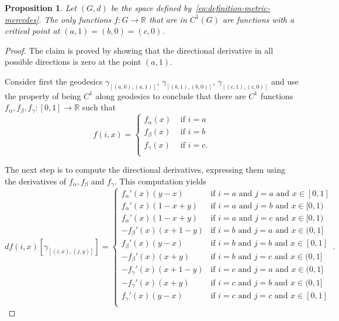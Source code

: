 \documentclass{article}
\theoremstyle{plain}\newtheorem{theorem}{Theorem}[section]
\theoremstyle{plain}\newtheorem{definition}[theorem]{Definition}
\theoremstyle{plain}\newtheorem{lemma}[theorem]{Lemma}
\theoremstyle{definition}\newtheorem{remark}[theorem]{Remark}
\theoremstyle{definition}\newtheorem{example}[theorem]{Example}
\theoremstyle{plain}\newtheorem{proposition}[theorem]{Proposition}
\theoremstyle{plain}\newtheorem{inference}[theorem]{Inference}
\theoremstyle{plain}\newtheorem{corollary}[theorem]{Corollary}
\theoremstyle{plain}\newtheorem{assumption}[theorem]{Assumption}
\newcommand{\bbR}{\mathbb{R}}
\begin{document}
\begin{proposition}
  Let $(G, d)$ be the space defined by~\eqref{eq:definition-metric-mercedes}.
  The only functions $f:G \to \mathbb{R}$ that are in $C^1(G)$  are 
  functions with a critical point at $(a, 1) = (b, 0) = (c, 0)$. 
\end{proposition}
\begin{proof}
The claim is proved by showing that the directional derivative in all possible 
directions is zero at the point $(a, 1)$.   

Consider first the geodesics
  $\gamma_{[(a, 0), (a, 1)]}$, $\gamma_{[(b, 1), (b, 0)]}$, $\gamma_{[(c, 1), (c, 0)]}$ and use
  the property of being $C^1$ along geodesics to conclude that there are $C^1$ functions
  $f_\alpha, f_\beta, f_\gamma:[0, 1] \to \bbR$ such that
  \begin{equation*}
    f(i, x) =
    \left\{
      \begin{array}{ll}
        f_\alpha(x) & \text{ if } i = a  \\
        f_\beta(x) & \text{ if } i = b  \\
        f_\gamma(x) & \text{ if } i = c. \\
      \end{array}
    \right.
  \end{equation*}

  The next step is to compute the directional derivatives, expressing
  them using the derivatives of $f_\alpha,f_\beta$ and $f_\gamma$.
This computation yields
  \begin{equation*}
    df(i, x)[\gamma_{[(i, x), (j, y)]}] =
    \left\{
      \begin{array}{ll}
        f_\alpha'(x) (y - x)
        & \!\!\text{if } i = a \text{ and } j = a \text{ and } x \in [0, 1] \\
        f_\alpha'(x) (1 - x + y)
        & \!\!\text{if } i = a \text{ and } j = b \text{ and } x \in [0, 1) \\
        f_\alpha'(x) (1 - x + y)
        & \!\!\text{if } i = a \text{ and } j = c \text{ and } x \in [0, 1) \\
        - f_\beta'(x) (x + 1 - y)
        & \!\!\text{if } i = b \text{ and } j = a \text{ and } x \in (0, 1]  \\
        f_\beta'(x) (y - x)
        & \!\!\text{if } i = b \text{ and } j = b \text{ and } x \in [0, 1] \\
        - f_\beta'(x) (x + y)
        & \!\!\text{if } i = b \text{ and } j = c \text{ and } x \in (0, 1] \\
        - f_\gamma'(x) (x + 1 - y)
        & \!\!\text{if } i = c \text{ and } j = a \text{ and } x \in (0, 1] \\
        - f_\gamma'(x) (x + y)
        & \!\!\text{if } i = c \text{ and } j = b \text{ and } x \in (0, 1] \\
        f_\gamma'(x) (y - x)
        & \!\!\text{if } i = c \text{ and } j = c \text{ and } x \in [0, 1] \\
      \end{array}
    \right. .
  \end{equation*}


\end{proof}
\end{document}
